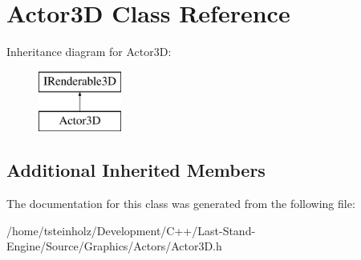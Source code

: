 \hypertarget{classActor3D}{}\section{Actor3\+D Class Reference}
\label{classActor3D}
Inheritance diagram for Actor3\+D\+:\begin{figure}[H]
\begin{center}
\leavevmode
\includegraphics[height=2.000000cm]{classActor3D}
\end{center}
\end{figure}
\subsection*{Additional Inherited Members}


The documentation for this class was generated from the following file\+:\begin{DoxyCompactItemize}
\item 
/home/tsteinholz/\+Development/\+C++/\+Last-\/\+Stand-\/\+Engine/\+Source/\+Graphics/\+Actors/Actor3\+D.\+h\end{DoxyCompactItemize}
